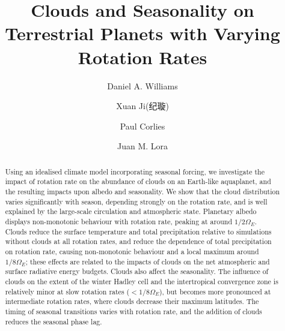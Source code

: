 \documentclass[trackchanges,linenumbers,twocolumn]{aastex631}
\begin{document}
\begin{CJK*}{UTF8}{gbsn}

\title{Clouds and Seasonality on Terrestrial Planets with Varying Rotation Rates}

\author[0000-0002-5840-2411]{Daniel A. Williams}

\author[0000-0002-1592-7832]{Xuan Ji(纪璇)}


\author[0000-0002-6417-9316]{Paul Corlies}

\author[0000-0001-9925-1050]{Juan M. Lora}



\begin{abstract}
Using an idealised climate model incorporating seasonal forcing, we investigate the impact of rotation rate on the abundance of clouds on an Earth-like aquaplanet, and the resulting impacts upon albedo and seasonality. We show that the cloud distribution varies significantly with season, depending strongly on the rotation rate, and is well explained by the large-scale circulation and atmospheric state. Planetary albedo displays non-monotonic behaviour with rotation rate, peaking at around $1/2\Omega_E$. Clouds reduce the surface temperature and total precipitation relative to simulations without clouds at all rotation rates, and reduce the dependence of total precipitation on rotation rate, causing non-monotonic behaviour and a local maximum around $1/8\Omega_E$; these effects are related to the impacts of clouds on the net atmospheric and surface radiative energy budgets. Clouds also affect the seasonality. The influence of clouds on the extent of the winter Hadley cell and the intertropical convergence zone is relatively minor at slow rotation rates ($< 1/8\Omega_E$), but becomes more pronounced at intermediate rotation rates, where clouds decrease their maximum latitudes. The timing of seasonal transitions varies with rotation rate, and the addition of clouds reduces the seasonal phase lag.
\end{abstract}


\end{CJK*}
\end{document}
